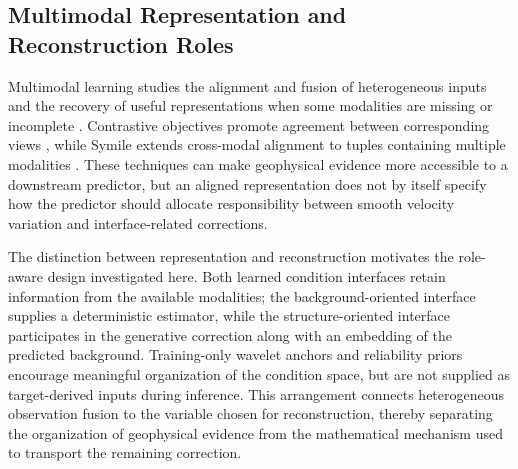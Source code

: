 \subsection{Multimodal Representation and Reconstruction Roles}

Multimodal learning studies the alignment and fusion of heterogeneous inputs and the recovery of useful representations when some modalities are missing or incomplete \citep{baltrusaitis2019multimodal,havaei2016hemis}. Contrastive objectives promote agreement between corresponding views \citep{tian2020cmc}, while Symile extends cross-modal alignment to tuples containing multiple modalities \citep{saporta2024symile}. These techniques can make geophysical evidence more accessible to a downstream predictor, but an aligned representation does not by itself specify how the predictor should allocate responsibility between smooth velocity variation and interface-related corrections.

The distinction between representation and reconstruction motivates the role-aware design investigated here. Both learned condition interfaces retain information from the available modalities; the background-oriented interface supplies a deterministic estimator, while the structure-oriented interface participates in the generative correction along with an embedding of the predicted background. Training-only wavelet anchors and reliability priors encourage meaningful organization of the condition space, but are not supplied as target-derived inputs during inference. This arrangement connects heterogeneous observation fusion to the variable chosen for reconstruction, thereby separating the organization of geophysical evidence from the mathematical mechanism used to transport the remaining correction.
